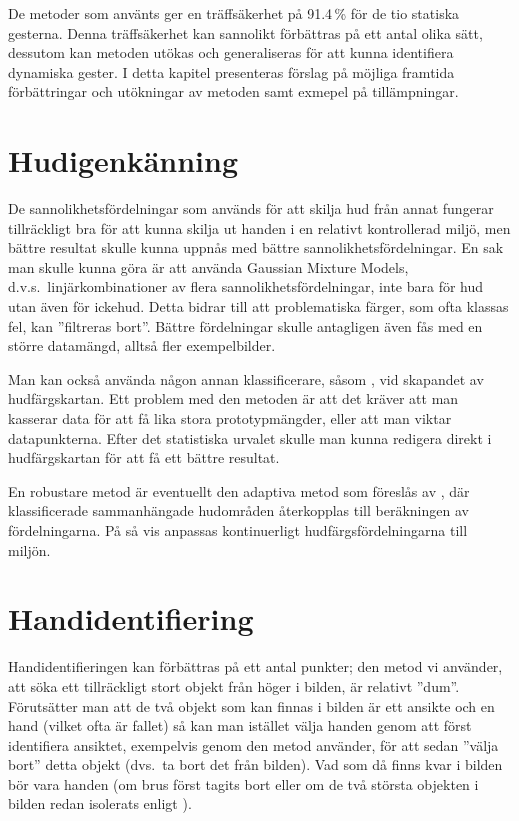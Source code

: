 \documentclass[../rapport_MVEX01-11-05]{subfiles}
\begin{document}
De metoder som använts ger en träffsäkerhet på 91.4\,\% för de tio statiska
gesterna. Denna träffsäkerhet kan sannolikt förbättras på ett antal
olika sätt, dessutom
kan metoden utökas och generaliseras för att kunna identifiera
dynamiska gester. I detta kapitel presenteras förslag på möjliga framtida
förbättringar och utökningar av metoden samt exmepel på tillämpningar.

\section{Hudigenkänning}
De sannolikhetsfördelningar som används för att skilja hud från annat
fungerar tillräckligt bra för att kunna skilja ut handen i en
relativt kontrollerad miljö, men bättre resultat skulle kunna uppnås
med bättre sannolikhetsfördelningar. En sak man skulle kunna göra
är att använda Gaussian Mixture Models, d.v.s.~linjärkombinationer av flera
sannolikhetsfördelningar, inte bara för hud utan även för ickehud.
Detta bidrar till att problematiska färger, som ofta klassas fel,
kan ''filtreras bort''.
Bättre fördelningar skulle
antagligen även fås med en större datamängd, alltså fler
exempelbilder.

Man kan också använda någon annan klassificerare, såsom \knn,
vid skapandet av hudfärgskartan. Ett problem med den metoden är att det
kräver att man kasserar data för att få lika stora prototypmängder,
eller att man viktar datapunkterna.
Efter det statistiska urvalet skulle man kunna redigera direkt i
hudfärgskartan för att få ett bättre resultat.

En robustare metod är eventuellt den adaptiva metod som föreslås av
, där klassificerade sammanhängade
hudområden återkopplas till beräkningen av fördelningarna.
På så vis anpassas kontinuerligt hudfärgsfördelningarna till miljön.

\section{Handidentifiering}
Handidentifieringen kan förbättras på ett antal punkter;
den metod vi använder, att söka ett tillräckligt stort objekt från höger i
bilden, är relativt ''dum''. Förutsätter man att de två objekt som kan finnas
i bilden är ett ansikte och en hand (vilket ofta är fallet) så kan man
istället välja handen genom att först identifiera ansiktet, exempelvis genom
den metod  använder, för att sedan ''välja bort'' detta
objekt (dvs.~ta bort det från bilden). Vad som då finns kvar i bilden bör vara
handen (om brus först tagits bort eller om de två största
objekten i bilden redan isolerats enligt ).
\end{document}
